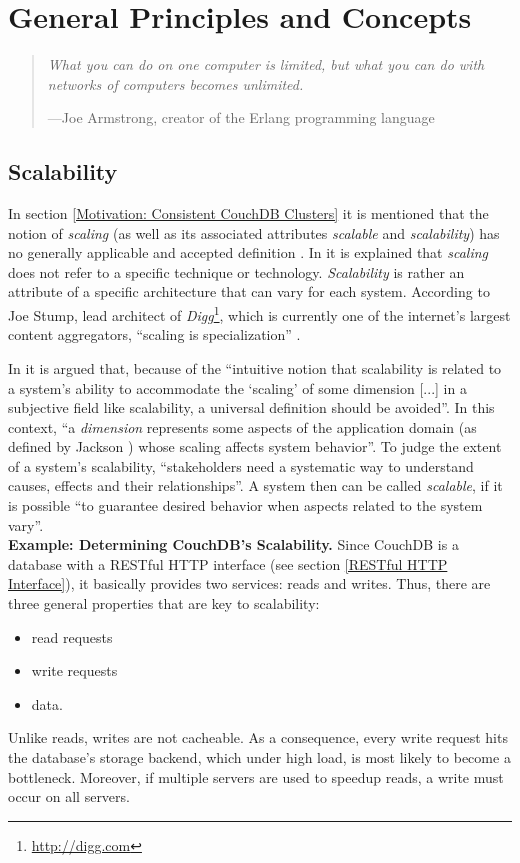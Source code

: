 \chapter{General Principles and Concepts}

\begin{quote}
{\itshape
What you can do on one computer is limited, but what you can do with networks of computers becomes unlimited.
}

\hspace{1em}---Joe Armstrong, creator of the Erlang programming language \cite[p.~20]{Arm07}\\
\end{quote}

\section{Scalability}
\label{Scalability}

In section \ref{Motivation: Consistent CouchDB Clusters} it is mentioned that the notion of \emph{scaling} (as well as its associated attributes \emph{scalable} and \emph{scalability}) has no generally applicable and accepted definition \cite{Hil90}. In \cite[p.~145]{ASL10} it is explained that \emph{scaling} does not refer to a specific technique or technology. \emph{Scalability} is rather an attribute of a specific architecture that can vary for each system. According to Joe Stump, lead architect of \emph{Digg}\footnote{\url{http://digg.com}}, which is currently one of the internet's largest content aggregators, ``scaling is specialization'' \cite{Wat08}.

In \cite{DRW06} it is argued that, because of the ``intuitive notion that scalability is related to a system's ability to accommodate the `scaling' of some dimension [...] in a subjective field like scalability, a universal definition should be avoided''. In this context, ``a \emph{dimension} represents some aspects of the application domain (as defined by Jackson \cite{Jac95}) whose scaling affects system behavior''. To judge the extent of a system's scalability, ``stakeholders need a systematic way to understand causes, effects and their relationships''. A system then can be called \emph{scalable}, if it is possible ``to guarantee desired behavior when aspects related to the system vary''.\\

\noindent
{\bf Example: Determining CouchDB's Scalability.}
Since CouchDB is a database with a RESTful HTTP interface (see section \ref{RESTful HTTP Interface}), it basically provides two services: reads and writes.
Thus, there are three general properties that are key to scalability:
\begin{itemize}
	\item read requests
	\item write requests
	\item data.
\end{itemize}
\noindent
Unlike reads, writes are not cacheable. As a consequence, every write request hits the database's storage backend, which under high load, is most likely to become a bottleneck. Moreover, if multiple servers are used to speedup reads, a write must occur on all servers.

